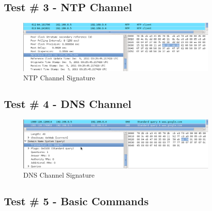 \documentclass[titlepage]{article}
\begin{document}
\subsection{Test \# 3 - NTP Channel}

\begin{figure}[htb]                                                                       
  \begin{center}
    \includegraphics[width=0.9\textwidth]{Pictures/NTP_SIG.png}
  \end{center}
  \caption{NTP Channel Signature}
  \label{fig:ntp_sig}
\end{figure}

\clearpage

\subsection{Test \# 4 - DNS Channel}

\begin{figure}[htb]                                                                       
  \begin{center}
    \includegraphics[width=0.9\textwidth]{Pictures/DNS_SIG.png}
  \end{center}
  \caption{DNS Channel Signature}
  \label{fig:dns_sig}
\end{figure}

\clearpage

\subsection{Test \# 5 - Basic Commands}
\end{document}
